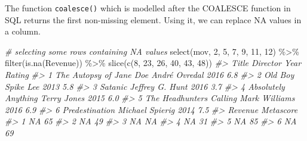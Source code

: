 \documentclass[
]{book}
\newenvironment{Shaded}{\begin{snugshade}}{\end{snugshade}}
\newcommand{\CommentTok}[1]{\textcolor[rgb]{0.56,0.35,0.01}{\textit{#1}}}
\newcommand{\DecValTok}[1]{\textcolor[rgb]{0.00,0.00,0.81}{#1}}
\newcommand{\FunctionTok}[1]{\textcolor[rgb]{0.00,0.00,0.00}{#1}}
\newcommand{\NormalTok}[1]{#1}
\newcommand{\SpecialCharTok}[1]{\textcolor[rgb]{0.00,0.00,0.00}{#1}}
\begin{document}
The function \texttt{coalesce()} which is modelled after the COALESCE function in SQL returns the first non-missing element. Using it, we can replace NA values in a column.

\begin{Shaded}
\begin{Highlighting}[]
\CommentTok{\# selecting some rows containing NA values}
\FunctionTok{select}\NormalTok{(mov, }\DecValTok{2}\NormalTok{, }\DecValTok{5}\NormalTok{, }\DecValTok{7}\NormalTok{, }\DecValTok{9}\NormalTok{, }\DecValTok{11}\NormalTok{, }\DecValTok{12}\NormalTok{) }\SpecialCharTok{\%\textgreater{}\%}
  \FunctionTok{filter}\NormalTok{(}\FunctionTok{is.na}\NormalTok{(Revenue)) }\SpecialCharTok{\%\textgreater{}\%}
  \FunctionTok{slice}\NormalTok{(}\FunctionTok{c}\NormalTok{(}\DecValTok{8}\NormalTok{, }\DecValTok{23}\NormalTok{, }\DecValTok{26}\NormalTok{, }\DecValTok{40}\NormalTok{, }\DecValTok{43}\NormalTok{, }\DecValTok{48}\NormalTok{))}
\CommentTok{\#\textgreater{}                      Title        Director Year Rating}
\CommentTok{\#\textgreater{} 1  The Autopsy of Jane Doe   André Ovredal 2016    6.8}
\CommentTok{\#\textgreater{} 2                  Old Boy       Spike Lee 2013    5.8}
\CommentTok{\#\textgreater{} 3                  Satanic Jeffrey G. Hunt 2016    3.7}
\CommentTok{\#\textgreater{} 4      Absolutely Anything     Terry Jones 2015    6.0}
\CommentTok{\#\textgreater{} 5 The Headhunter\textquotesingle{}s Calling   Mark Williams 2016    6.9}
\CommentTok{\#\textgreater{} 6           Predestination Michael Spierig 2014    7.5}
\CommentTok{\#\textgreater{}   Revenue Metascore}
\CommentTok{\#\textgreater{} 1      NA        65}
\CommentTok{\#\textgreater{} 2      NA        49}
\CommentTok{\#\textgreater{} 3      NA        NA}
\CommentTok{\#\textgreater{} 4      NA        31}
\CommentTok{\#\textgreater{} 5      NA        85}
\CommentTok{\#\textgreater{} 6      NA        69}


\end{Highlighting}
\end{Shaded}
\end{document}
